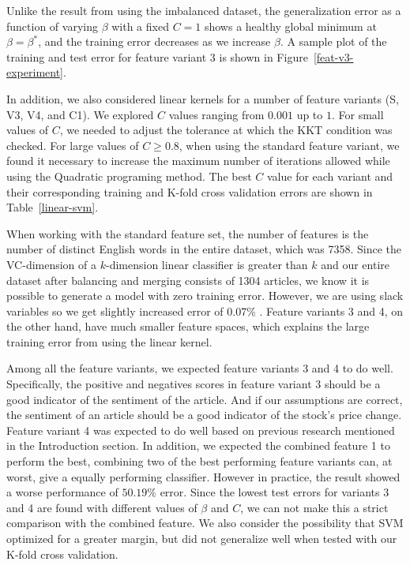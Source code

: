\documentclass{article}
\begin{document}
Unlike the result from using the imbalanced dataset, the generalization error as a function of varying $\beta$ with a fixed $C=1$ shows a healthy global minimum at $\beta=\beta^*$, and the training error decreases as we increase $\beta$. A sample plot of the training and test error for feature variant 3 is shown in Figure~\ref{feat-v3-experiment}. 

In addition, we also considered linear kernels for a number of feature variants (S, V3, V4, and C1). We explored $C$ values ranging from $0.001$ up to $1$. For small values of $C$, we needed to adjust the tolerance at which the KKT condition was checked. For large values of $C\geq0.8$, when using the standard feature variant, we found it necessary to increase the maximum number of iterations allowed while using the Quadratic programing method. The best $C$ value for each variant and their corresponding training and K-fold cross validation errors are shown in Table~\ref{linear-svm}. 

When working with the standard feature set, the number of features is the number of distinct English words in the entire dataset, which was 7358. Since the VC-dimension of a $k$-dimension linear classifier is greater than $k$ and our entire dataset after balancing and merging consists of 1304 articles, we know it is possible to generate a model with zero training error. However, we are using slack variables so we get slightly increased error of 0.07\%
. Feature variants 3 and 4, on the other hand, have much smaller feature spaces, which explains the large training error from using the linear kernel.

Among all the feature variants, we expected feature variants 3 and 4 to do well. Specifically, the positive and negatives scores in feature variant 3 should be a good indicator of the sentiment of the article. And if our assumptions are correct, the sentiment of an article should be a good indicator of the stock's price change. Feature variant 4 was expected to do well based on previous research mentioned in the Introduction section. In addition, we expected the combined feature 1 to perform the best, combining two of the best performing feature variants can, at worst, give a equally performing classifier. However in practice, the result showed a worse performance of $50.19\%$ error. Since the lowest test errors for variants 3 and 4 are found with different values of $\beta$ and $C$, we can not make this a strict comparison with the combined feature. We also consider the possibility that SVM optimized for a greater margin, but did not generalize well when tested with our K-fold cross validation. 
\end{document}

